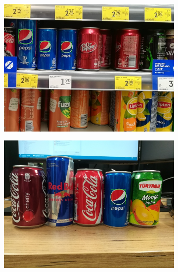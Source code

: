 \documentclass[11pt,a4paper,twoside]{report}
\begin{document}
\begin{figure}
\begin{subfigure}[b]{0.48\textwidth}
	    \end{subfigure}
	    ~
	    \begin{subfigure}[b]{0.48\textwidth}
	        \includegraphics[width=\textwidth]{img/camera/5}
	    \end{subfigure}
	    \begin{subfigure}[b]{0.48\textwidth}
	        \includegraphics[width=\textwidth]{img/camera/6}
	    \end{subfigure}
	    ~
	    \begin{subfigure}[b]{0.48\textwidth}

\end{subfigure}
\end{figure}
\end{document}
